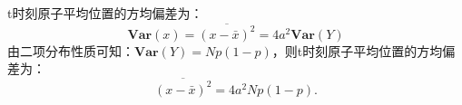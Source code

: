 \documentclass[a4paper,12pt]{article}
\begin{document}
\subsection{}
t时刻原子平均位置的方均偏差为：
\begin{equation}\nonumber
	\mathbf{Var}(x) = \overline{(x - \bar{x})^2} = 4a^2 \mathbf{Var}(Y)
\end{equation}
由二项分布性质可知：$\mathbf{Var}(Y) = Np(1-p)$，则t时刻原子平均位置的方均偏差为：
\begin{equation}\nonumber
	\overline{(x - \bar{x})^2} = 4a^2Np(1-p).
\end{equation}
\end{document}
